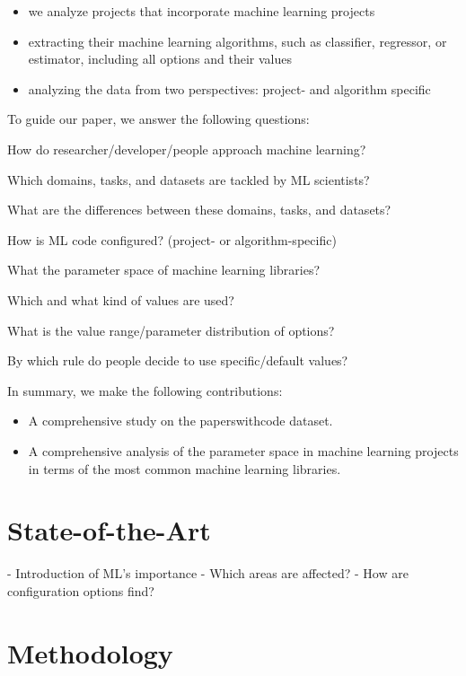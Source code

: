\documentclass[sigconf,review,anonymous]{acmart}
\begin{document}
\begin{itemize}
    \item we analyze projects that incorporate machine learning projects
    \item extracting their machine learning algorithms, such as classifier, regressor, or estimator, including all options and their values
    \item analyzing the data from two perspectives: project- and algorithm specific
\end{itemize}

To guide our paper, we answer the following questions:
\begin{questions}
    \item How do researcher/developer/people approach machine learning? 
    \item Which domains, tasks, and datasets are tackled by ML scientists? 
    \item What are the differences between these domains, tasks, and datasets?    
    \item How is ML code configured? (project- or algorithm-specific) 
    \item What the parameter space of machine learning libraries?
    \item Which and what kind of values are used?
    \item What is the value range/parameter distribution of options?
    \item By which rule do people decide to use specific/default values?
\end{questions}


In summary, we make the following contributions:
\begin{itemize}
    \item A comprehensive study on the paperswithcode dataset.
    \item A comprehensive analysis of the parameter space in machine learning projects in terms of the most common machine learning libraries.
\end{itemize}


\section{State-of-the-Art}\label{sec:background}
- Introduction of ML's importance
- Which areas are affected?
- How are configuration options find?


\section{Methodology}\label{sec:methodology}
\end{document}
